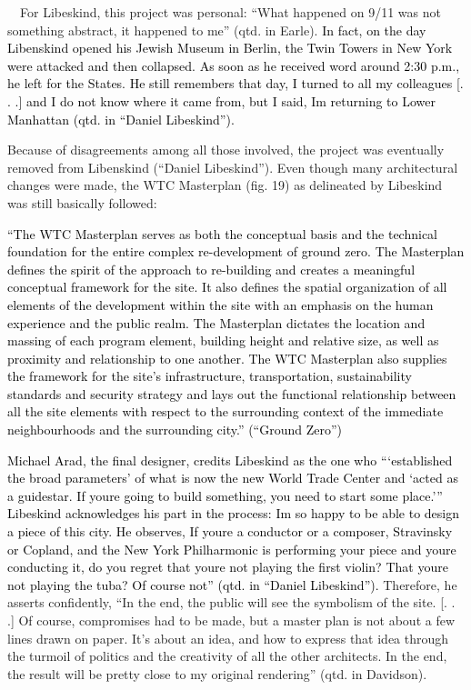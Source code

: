 \ \ For Libeskind, this project was personal: “What happened on 9/11 was
not something abstract, it happened to me” (qtd. in
Earle).\textcolor{black}{  In fact, on the day Libenskind opened his
Jewish Museum in Berlin, the Twin Towers in New York were attacked and
then collapsed.  As soon as he received word around 2:30 p.m., he left
for the States.  He still  remembers that day, {\textquotedbl}I turned
to all my colleagues [. . .] and I do not know where it came from, but
I said, {\textquotesingle}I{\textquotesingle}m returning to Lower
Manhattan{\textquotesingle}{\textquotedbl}  (qtd. in “Daniel
Libeskind”). }

Because of disagreements among all those involved, the project was
eventually removed from Libenskind (“Daniel Libeskind”).  Even though
many architectural changes were made, the WTC Masterplan (fig. 19) as
delineated by Libeskind was still basically followed: 

\textcolor{black}{“The WTC Masterplan serves as both the conceptual
basis and the technical foundation for the entire complex
re-development of ground zero.  The Masterplan defines the spirit of
the approach to re-building and creates a meaningful conceptual
framework for the site.  It also defines the spatial organization of
all elements of the development within the site with an emphasis on the
human experience and the public realm.  The Masterplan dictates the
location and massing of each program element, building height and
relative size, as well as proximity and relationship to one another. 
The WTC Masterplan also supplies the framework for the site’s
infrastructure, transportation, sustainability standards and security
strategy and lays out the functional relationship between all the site
elements with respect to the surrounding context of the immediate
neighbourhoods and the surrounding city.”  (“Ground Zero”)}

\textcolor{black}{Michael Arad, the final designer, credits Libeskind as
the one who “‘established the broad parameters’ of what is now the new
World Trade Center and ‘acted as a guidestar.  If
you{\textquotesingle}re }\textcolor{black}{going to build something,
you need to start some place.’”  Libeskind acknowledges his part in the
process: {\textquotedbl}I{\textquotesingle}m so happy to be able to
design a piece of this city.{\textquotedbl}  He observes,
{\textquotedbl}If you{\textquotesingle}re a conductor or a composer,
Stravinsky or Copland, and the New York Philharmonic is performing your
piece and you{\textquotesingle}re conducting it, do you regret that
you{\textquotesingle}re not playing the first violin?  That
you{\textquotesingle}re not playing the tuba?  Of course not” (qtd. in
“Daniel Libeskind”). 
}\textcolor[rgb]{0.13725491,0.13725491,0.13725491}{Therefore, he
asserts confidently, “In the end, the public will see the symbolism of
the site.  [. . .] Of course, compromises had to be made, but a master
plan is not about a few lines drawn on paper.  It’s about an idea, and
how to express that idea through the turmoil of politics and the
creativity of all the other architects.  In the end, the result will be
pretty close to my original rendering” (qtd. in Davidson).  }

